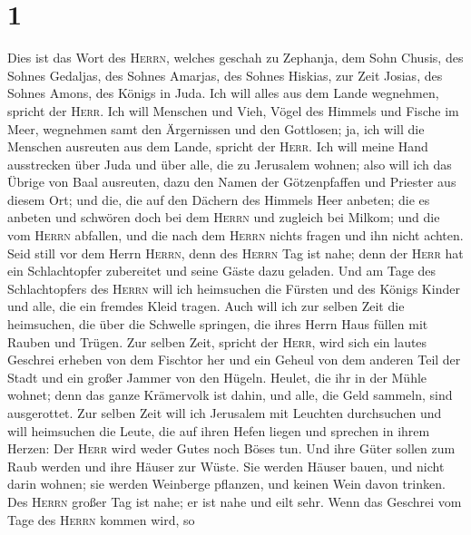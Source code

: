 \hypertarget{section}{%
\section{1}\label{section}}

 Dies ist das Wort des \textsc{Herrn}, welches geschah zu
Zephanja, dem Sohn Chusis, des Sohnes Gedaljas, des Sohnes Amarjas, des
Sohnes Hiskias, zur Zeit Josias, des Sohnes Amons, des Königs in Juda.
 Ich will alles aus dem Lande wegnehmen, spricht der
\textsc{Herr}.  Ich will Menschen und Vieh, Vögel des
Himmels und Fische im Meer, wegnehmen samt den Ärgernissen und den
Gottlosen; ja, ich will die Menschen ausreuten aus dem Lande, spricht
der \textsc{Herr}.  Ich will meine Hand ausstrecken über
Juda und über alle, die zu Jerusalem wohnen; also will ich das Übrige
von Baal ausreuten, dazu den Namen der Götzenpfaffen und Priester aus
diesem Ort;  und die, die auf den Dächern des Himmels Heer
anbeten; die es anbeten und schwören doch bei dem \textsc{Herrn} und
zugleich bei Milkom;  und die vom \textsc{Herrn} abfallen,
und die nach dem \textsc{Herrn} nichts fragen und ihn nicht achten.
 Seid still vor dem Herrn \textsc{Herrn}, denn des
\textsc{Herrn} Tag ist nahe; denn der \textsc{Herr} hat ein
Schlachtopfer zubereitet und seine Gäste dazu geladen. 
Und am Tage des Schlachtopfers des \textsc{Herrn} will ich heimsuchen
die Fürsten und des Königs Kinder und alle, die ein fremdes Kleid
tragen.  Auch will ich zur selben Zeit die heimsuchen, die
über die Schwelle springen, die ihres Herrn Haus füllen mit Rauben und
Trügen.  Zur selben Zeit, spricht der \textsc{Herr}, wird
sich ein lautes Geschrei erheben von dem Fischtor her und ein Geheul von
dem anderen Teil der Stadt und ein großer Jammer von den Hügeln.
 Heulet, die ihr in der Mühle wohnet; denn das ganze
Krämervolk ist dahin, und alle, die Geld sammeln, sind ausgerottet.
 Zur selben Zeit will ich Jerusalem mit Leuchten
durchsuchen und will heimsuchen die Leute, die auf ihren Hefen liegen
und sprechen in ihrem Herzen: Der \textsc{Herr} wird weder Gutes noch
Böses tun.  Und ihre Güter sollen zum Raub werden und
ihre Häuser zur Wüste. Sie werden Häuser bauen, und nicht darin wohnen;
sie werden Weinberge pflanzen, und keinen Wein davon trinken.
 Des \textsc{Herrn} großer Tag ist nahe; er ist nahe und
eilt sehr. Wenn das Geschrei vom Tage des \textsc{Herrn} kommen wird, so
